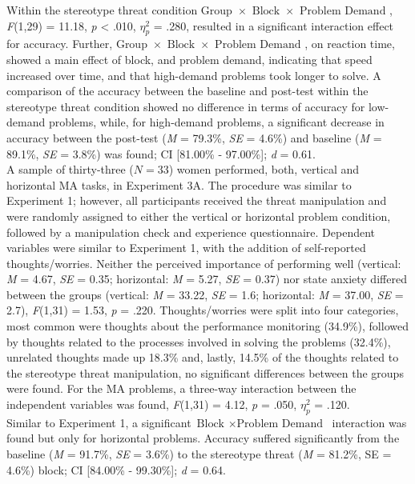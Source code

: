 \documentclass[
  stu,floatsintext]{apa7}
\begin{document}
Within the stereotype threat condition \(\text{Group } \times \text{ Block } \times \text{ Problem Demand }\), \emph{F}(1,29) = 11.18, \emph{p} \textless{} .010, \(\eta^{2}_{p}\) = .280, resulted in a significant interaction effect for accuracy.
Further, \(\text{Group } \times \text{ Block } \times \text{ Problem Demand }\), on reaction time, showed a main effect of block, and problem demand, indicating that speed increased over time, and that high-demand problems took longer to solve.
A comparison of the accuracy between the baseline and post-test within the stereotype threat condition showed no difference in terms of accuracy for low-demand problems, while, for high-demand problems, a significant decrease in accuracy between the post-test (\emph{M} = 79.3\%, \emph{SE} = 4.6\%) and baseline (\emph{M} = 89.1\%, \emph{SE} = 3.8\%) was found; CI {[}81.00\% - 97.00\%{]}; \emph{d} = 0.61.\\
A sample of thirty-three (\(N = 33\)) women performed, both, vertical and horizontal MA tasks, in Experiment 3A.
The procedure was similar to Experiment 1; however, all participants received the threat manipulation and were randomly assigned to either the vertical or horizontal problem condition, followed by a manipulation check and experience questionnaire.
Dependent variables were similar to Experiment 1, with the addition of self-reported thoughts/worries.
Neither the perceived importance of performing well (vertical: \emph{M} = 4.67, \emph{SE} = 0.35; horizontal: \emph{M} = 5.27, \emph{SE} = 0.37) nor state anxiety differed between the groups (vertical: \emph{M} = 33.22, \emph{SE} = 1.6; horizontal: \emph{M} = 37.00, \emph{SE} = 2.7), \emph{F}(1,31) = 1.53, \emph{p} = .220.
Thoughts/worries were split into four categories, most common were thoughts about the performance monitoring (34.9\%), followed by thoughts related to the processes involved in solving the problems (32.4\%), unrelated thoughts made up 18.3\% and, lastly, 14.5\% of the thoughts related to the stereotype threat manipulation, no significant differences between the groups were found.
For the MA problems, a three-way interaction between the independent variables was found, \emph{F}(1,31) = 4.12, \emph{p} = .050, \(\eta^{2}_{p}\) = .120.\\
Similar to Experiment 1, a significant \(\text{Block } \times \text{Problem Demand }\) interaction was found but only for horizontal problems.
Accuracy suffered significantly from the baseline (\emph{M} = 91.7\%, \emph{SE} = 3.6\%) to the stereotype threat (\emph{M} = 81.2\%, SE = 4.6\%) block; CI {[}84.00\% - 99.30\%{]}; \emph{d} = 0.64.
\end{document}
